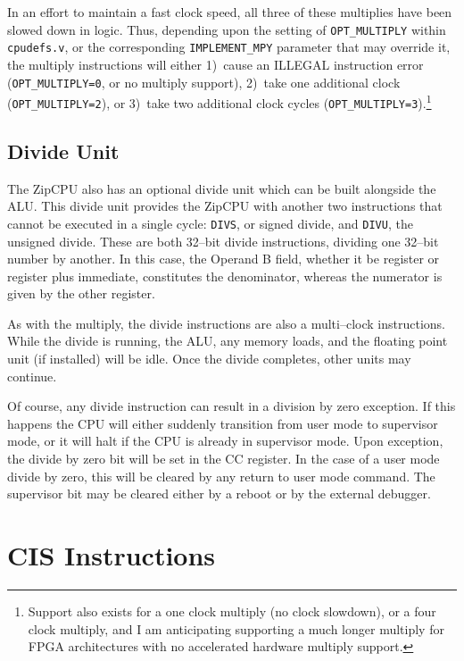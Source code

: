 \documentclass{gqtekspec}
\begin{document}
In an effort to maintain a fast clock speed, all three of these multiplies
have been slowed down in logic.  Thus, depending upon the setting of
{\tt OPT\_MULTIPLY} within {\tt cpudefs.v}, or the corresponding
{\tt IMPLEMENT\_MPY} parameter that may override it, the multiply instructions
will either 1)~cause an ILLEGAL instruction error ({\tt OPT\_MULTIPLY=0}, or
no multiply support), 2)~take one additional clock ({\tt OPT\_MULTIPLY=2}),
or 3)~take two additional clock cycles ({\tt OPT\_MULTIPLY=3}).\footnote{Support
also exists for a one clock multiply (no clock slowdown), or a four clock
multiply, and I am anticipating supporting a much longer multiply for FPGA
architectures with no accelerated hardware multiply support.}

\subsection{Divide Unit}
The ZipCPU also has an optional divide unit which can be built alongside the
ALU.  This divide unit provides the ZipCPU with another two instructions that
cannot be executed in a single cycle: {\tt DIVS}, or signed divide, and
{\tt DIVU}, the unsigned divide.  These are both 32--bit divide instructions,
dividing one 32--bit number by another.  In this case, the Operand B field,
whether it be register or register plus immediate, constitutes the denominator,
whereas the numerator is given by the other register.

As with the multiply, the divide instructions are also a multi--clock
instructions.  While the divide is running, the ALU, any memory loads, and the
floating point unit (if installed) will be idle.  Once the divide completes,
other units may continue.

Of course, any divide instruction can result in a division by zero exception. 
If this happens the CPU will either suddenly transition from user mode to
supervisor mode, or it will halt if the CPU is already in supervisor mode.  Upon
exception, the divide by zero bit will be set in the CC register.  In the
case of a user mode divide by zero, this will be cleared by any return to user
mode command.  The supervisor bit may be cleared either by a reboot or by the
external debugger.

\section{CIS Instructions}
\end{document}
